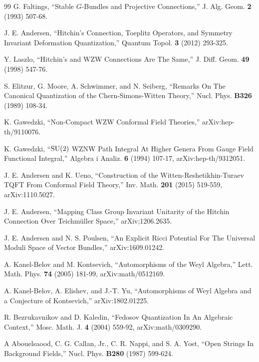 \begin{thebibliography}{99}
G. Faltings, ``Stable $G$-Bundles and Projective Connections,'' J. Alg. Geom. {\bf 2} (1993) 507-68.

J.  E. Andersen, ``Hitchin's Connection, Toeplitz Operators, and Symmetry Invariant Deformation Quantization,''  Quantum Topol. {\bf 3} (2012) 293-325.

Y. Laszlo, ``Hitchin's and WZW Connections Are The Same,'' J. Diff. Geom. {\bf 49} (1998) 547-76.

S. Elitzur, G. Moore, A. Schwimmer, and N. Seiberg,
``Remarks On The Canonical Quantization of the Chern-Simons-Witten
Theory,'' Nucl. Phys. {\bf B326} (1989) 108-34.

K. Gawedzki, ``Non-Compact WZW Conformal Field Theories,'' arXiv:hep-th/9110076.


K. Gawedzki, ``${\mathrm{SU}}(2)$ WZNW Path Integral At Higher Genera From Gauge Field Functional Integral,'' Algebra i Analiz. {\bf 6} (1994) 107-17,
arXiv:hep-th/9312051.

J. E. Andersen and K. Ueno, ``Construction of the Witten-Reshetikhin-Turaev TQFT From Conformal Field Theory,'' Inv. Math. {\bf 201}
(2015) 519-559, arXiv:1110.5027.

J. E. Andersen, ``Mapping Class Group Invariant Unitarity of the Hitchin Connection Over Teichm\"{u}ller Space,''
arXiv;1206.2635.

J. E. Andersen and N. S. Poulsen, ``An Explicit Ricci Potential For The Universal Moduli Space of Vector Bundles,'' arXiv:1609.01242.


A. Kanel-Belov and M. Kontsevich, ``Automorphisms of the Weyl Algebra,'' Lett. Math. Phys. {\bf 74} (2005) 181-99, arXiv:math/0512169.

A. Kanel-Belov, A. Elishev, and J.-T. Yu, ``Automorphisms of Weyl Algebra and a Conjecture of Kontsevich,'' arXiv:1802.01225.

R. Bezrukavnikov and D. Kaledin, ``Fedosov Quantization In An Algebraic Context,''  Mosc. Math. J. {\bf 4} (2004) 559-92, arXiv:math/0309290.

A Abouelsaood, C. G. Callan, Jr., C. R. Nappi, and S. A. Yost, ``Open Strings In Background Fields,'' Nucl. Phys. {\bf B280} (1987) 599-624.

\end{thebibliography}
